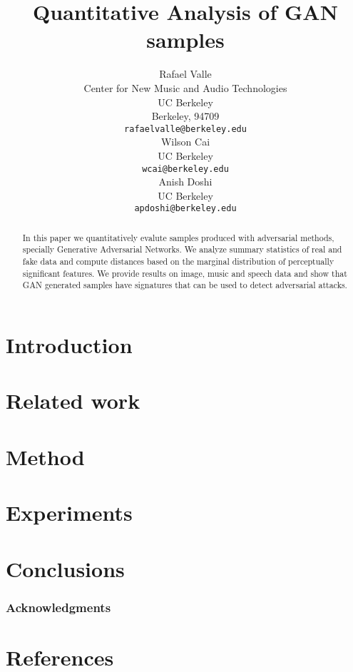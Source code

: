 \documentclass{article}
\title{Quantitative Analysis of GAN samples}
\author{
  Rafael Valle \\
  Center for New Music and Audio Technologies \\
  UC Berkeley \\
  Berkeley, 94709 \\
  \texttt{rafaelvalle@berkeley.edu} \\
  \And
  Wilson Cai\\
  UC Berkeley\\
  \texttt{wcai@berkeley.edu} \\
  \And
  Anish Doshi\\
  UC Berkeley\\
  \texttt{apdoshi@berkeley.edu} \\
}
\begin{document}

\maketitle

\begin{abstract}
    In this paper we quantitatively evalute samples produced with adversarial
    methods, specially Generative Adversarial Networks. We analyze summary
    statistics of real and fake data and compute distances based on the 
    marginal distribution of perceptually significant features. We provide results 
    on image, music and speech data and show that GAN generated samples have 
    signatures that can be used to detect adversarial attacks.
\end{abstract}

\theoremseparator{:}
\newtheorem{hyp}{Hypothesis}

\section{Introduction} \label{sec:introduction}

%
\section{Related work}\label{sec:related_work}

%
\section{Method}\label{sec:method}

%
\section{Experiments}\label{sec:experiments}

%
\section{Conclusions}\label{sec:conclusions}

%

\subsubsection*{Acknowledgments}


\section*{References}

\end{document}
